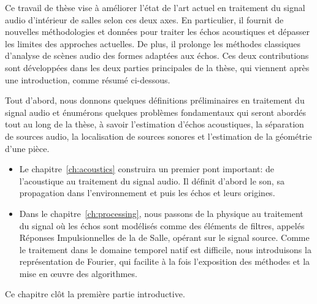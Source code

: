 \mynewline
Ce travail de thèse vise à améliorer l'état de l'art actuel en traitement du signal audio d'intérieur de salles selon ces deux axes.
En particulier, il fournit de nouvelles méthodologies et données pour traiter les échos acoustiques et dépasser les limites des approches actuelles.
De plus, il prolonge les méthodes classiques d'analyse de scènes audio des formes adaptées aux échos.
Ces deux contributions sont développées dans les deux parties principales de la thèse, qui viennent après une introduction, comme résumé ci-dessous.

Tout d'abord, nous donnons quelques définitions préliminaires en traitement du signal audio et énumérons quelques problèmes fondamentaux qui seront abordés tout au long de la thèse, à savoir l'estimation d'échos acoustiques, la séparation de sources audio, la localisation de sources sonores et l'estimation de la géométrie d'une pièce.
\begin{itemize}
    \item
    Le chapitre~\ref{ch:acoustics} construira un premier pont important:
    de l'acoustique au traitement du signal audio.
    Il définit d'abord le son, sa propagation dans l'environnement et puis les échos et leurs origines.
    \item
    Dans le chapitre~\ref{ch:processing}, nous passons de la physique au traitement du signal où les échos sont modélisés comme des éléments de filtres, appelés Réponses Impulsionnelles de la de Salle, opérant sur le signal source.
    Comme le traitement dans le domaine temporel natif est difficile, nous introduisons la représentation de Fourier, qui facilite à la fois l'exposition des méthodes et la mise en œuvre des algorithmes.
\end{itemize}
Ce chapitre clôt la première partie introductive.


